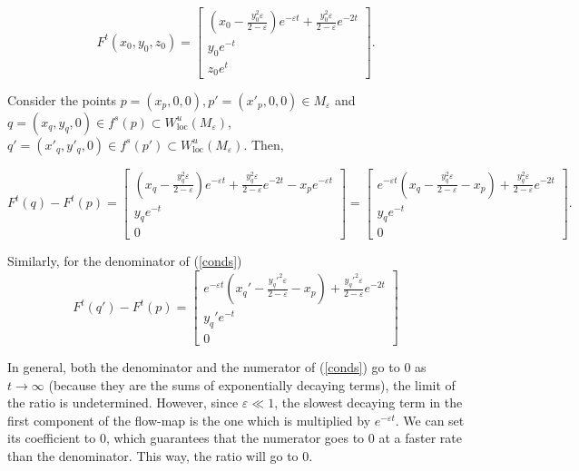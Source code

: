 \documentclass[a4paper,11pt,pdftex]{article}
\begin{document}
\begin{equation}
\label{eqflowmap2}
F^t(x_0,y_0,z_0) = \begin{bmatrix}
\left(x_0 - \frac{y_0^2 \varepsilon }{2-\varepsilon}\right)e^{-\varepsilon t} + \frac{y_0^2\varepsilon}{2-\varepsilon}e^{-2t} \\
y_0e^{-t} \\
z_0e^{t}
\end{bmatrix}.
\end{equation}


Consider the points $p = (x_p, 0, 0), p' = (x'_p, 0, 0)\in M_\varepsilon $ and $q = (x_q, y_q, 0) \in f^s(p)\subset W^u_{\text{loc}}(M_\varepsilon)$, $q' = (x'_q, y'_q, 0)\in f^s(p')\subset W^u_{\text{loc}}(M_\varepsilon)$.
Then, 

\begin{equation}
\label{eqflowmapdiff}
F^t(q) - F^t(p) = \begin{bmatrix}
\left(x_q - \frac{y_q^2 \varepsilon}{2-\varepsilon}\right)e^{-\varepsilon t} + \frac{y_q^2 \varepsilon }{2-\varepsilon}e^{-2t} - x_p e^{-\varepsilon t}\\
y_q e^{-t} \\
0
\end{bmatrix} = \begin{bmatrix}
e^{-\varepsilon t} \left(x_q - \frac{y_q^2 \varepsilon }{2-\varepsilon} - x_p \right) + \frac{y_q^2 \varepsilon }{2-\varepsilon}e^{-2t}\\
y_q e^{-t} \\
0
\end{bmatrix}.
\end{equation}

Similarly, for the denominator of (\ref{conds})
$$
F^t(q') - F^t(p) = \begin{bmatrix}
e^{-\varepsilon t} \left(x_q' - \frac{y_q'^2 \varepsilon}{2-\varepsilon} - x_p \right) + \frac{y_q'^2 \varepsilon }{2-\varepsilon}e^{-2t}\\
y_q' e^{-t} \\
0
\end{bmatrix}
$$

In general, both the denominator and the numerator of (\ref{conds}) go to 0 as $t\to \infty$ (because they are the sums of exponentially decaying terms), the limit of the ratio is undetermined. However, since $\varepsilon \ll 1$, the slowest decaying term in the first component of the flow-map is the one which is multiplied by $e^{-\varepsilon t}$. We can set its coefficient to 0, which guarantees that the numerator goes to $0$ at a faster rate than the denominator. This way, the ratio will go to 0. 
\end{document}
